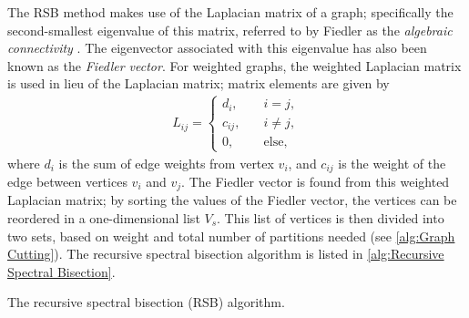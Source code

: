 {{{{        The \ac{RSB} method makes use of the Laplacian matrix of a graph; specifically the second-smallest eigenvalue of this matrix, referred to by Fiedler as the \emph{algebraic connectivity} \cite{Fiedler1973}.
        The eigenvector associated with this eigenvalue has also been known as the \emph{Fiedler vector}.
        For weighted graphs, the weighted Laplacian matrix is used in lieu of the Laplacian matrix; matrix elements are given by
        \begin{align}
          \label{eq:Spatial Decomposition:Weighted Laplacian}
          L_{ij} =
            \begin{cases}
              d_i, \quad&{i=j},\\
              c_{ij}, \quad&{i\neq j},\\
              0, \quad&{\text{else}},
            \end{cases}
        \end{align}
        where $d_i$ is the sum of edge weights from vertex $v_i$, and $c_{ij}$ is the weight of the edge between vertices $v_i$ and $v_j$.
        The Fiedler vector is found from this weighted Laplacian matrix; by sorting the values of the Fiedler vector, the vertices can be reordered in a one-dimensional list $V_s$.
        This list of vertices is then divided into two sets, based on weight and total number of partitions needed (see \cref{alg:Graph Cutting}).
        The recursive spectral bisection algorithm is listed in \cref{alg:Recursive Spectral Bisection}.

        \begin{algorithm}
          \centering
          \caption{The recursive spectral bisection (RSB) algorithm.}
          \label{alg:Recursive Spectral Bisection}
          \begin{algorithmic}[1]
               
            \EndProcedure
          \end{algorithmic}
        \end{algorithm}
      }
}}}

